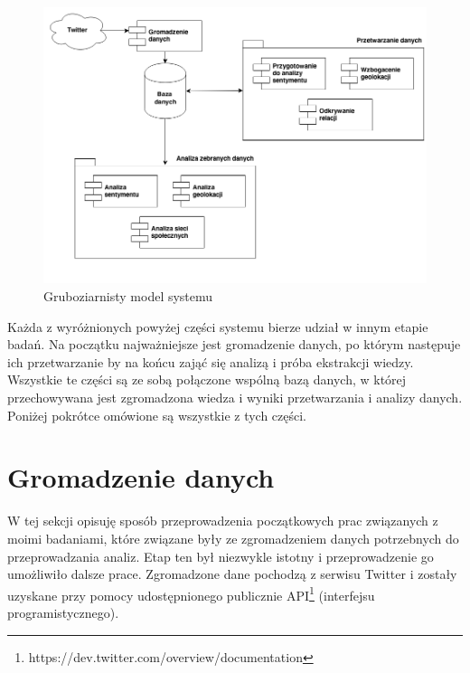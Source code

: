 \begin{figure}[ht!]
\centering
\includegraphics[width=140mm]{img/budowa-systemu.png}
\caption{Gruboziarnisty model systemu}
\label{image:gruboziarnisty-model-systemu}
\end{figure}

Każda z wyróżnionych powyżej części systemu bierze udział w innym etapie
badań. Na początku najważniejsze jest gromadzenie danych, po którym następuje
ich przetwarzanie by na końcu zająć się analizą i próba ekstrakcji wiedzy.
Wszystkie te części są ze sobą połączone wspólną bazą danych, w której
przechowywana jest zgromadzona wiedza i wyniki przetwarzania i analizy danych.
Poniżej pokrótce omówione są wszystkie z tych części.  

\section{Gromadzenie danych}
\label{section:gromadzeniedanych}
W tej sekcji opisuję sposób przeprowadzenia początkowych prac związanych
z moimi badaniami, które związane były ze zgromadzeniem danych potrzebnych
do przeprowadzania analiz. Etap ten był niezwykle istotny i przeprowadzenie
go umożliwiło dalsze prace. Zgromadzone dane pochodzą z serwisu Twitter
i zostały uzyskane przy pomocy udostępnionego publicznie 
API\footnote{https://dev.twitter.com/overview/documentation} (interfejsu
programistycznego).

